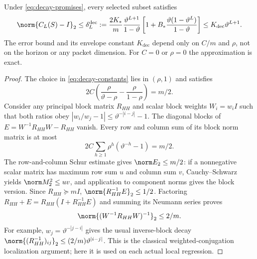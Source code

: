 \begin{theorem}
\label{thm:general-decay}
Under \eqref{eq:decay-promises}, every selected subset satisfies
\begin{equation}
 \norm{C_L(S)-I}_2\le\delta_L^{\mathrm{dec}}:=
 \frac{2K_*}{m}\frac{\vartheta^{L+1}}{1-\vartheta}
 \left[1+B_*\frac{\vartheta(1-\vartheta^L)}{1-\vartheta}\right]
 \le K_{\mathrm{dec}}\vartheta^{L+1}.
 \label{eq:decay-delta}
\end{equation}
The error bound and its envelope constant $K_{\mathrm{dec}}$ depend only
on $C/m$ and $\rho$, not on the horizon or any packet dimension.
For $C=0$ or $\rho=0$ the approximation is exact.
\end{theorem}
\begin{proof}
The choice in \eqref{eq:decay-constants} lies in $(\rho,1)$ and satisfies
\begin{equation}
 2C\left(\frac{\rho}{\vartheta-\rho}-\frac{\rho}{1-\rho}\right)=m/2.
 \label{eq:weighted-smallness}
\end{equation}
Consider any principal block matrix $R_{HH}$ and scalar block weights
$W_i=w_iI$ such that both ratios obey
$|w_i/w_j-1|\le\vartheta^{-|i-j|}-1$.
The diagonal blocks of
$E=W^{-1}R_{HH}W-R_{HH}$ vanish. Every row and column sum of its block
norm matrix is at most
\[
 2C\sum_{h\ge1}\rho^h(\vartheta^{-h}-1)=m/2.
\]
The row-and-column Schur estimate gives $\norm E_2\le m/2$:
if a nonnegative scalar matrix has maximum row sum $u$ and column sum $v$,
Cauchy--Schwarz yields $\norm M_2^2\le uv$, and application to component
norms gives the block version. Since $R_{HH}\succeq mI$,
$\norm{R_{HH}^{-1}E}_2\le1/2$. Factoring
$R_{HH}+E=R_{HH}(I+R_{HH}^{-1}E)$ and summing its Neumann series proves
\begin{equation}
 \norm{(W^{-1}R_{HH}W)^{-1}}_2\le2/m.
 \label{eq:conjugated-inverse}
\end{equation}
For example, $w_j=\vartheta^{-|j-i|}$ gives the usual inverse-block decay
$\norm{(R_{HH}^{-1})_{ij}}_2\le(2/m)\vartheta^{|i-j|}$.
This is the classical weighted-conjugation localization argument; here it
is used on each actual local regression.


\end{proof}
